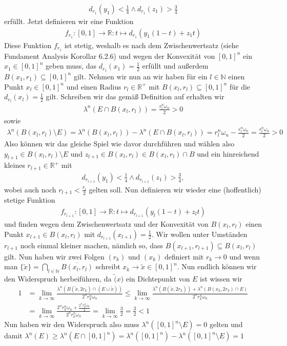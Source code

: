 \begin{solution}
\begin{align*}
    d_{r_1}(y_1)<\frac{1}{4}\land d_{r_1}(z_1)>\frac{3}{4}
\end{align*}
erfüllt.
Jetzt definieren wir eine Funktion
\begin{align*}
    f_{r_1}:[0,1]\to\mathbb{R}:t\mapsto d_{r_1}(y_1(1-t)+z_1t)
\end{align*}
Diese Funktion $f_{r_1}$ ist stetig, weshalb es nach dem Zwischenwertsatz (siehe Fundament Analysis Korollar 6.2.6) und wegen der Konvexität von $[0,1]^n$ ein $x_1\in[0,1]^n$ geben muss, das $d_{r_1}(x_1)=\frac{1}{2}$ erfüllt und außerdem $B(x_1,r_1)\subseteq[0,1]^n$ gilt. Nehmen wir nun an wir haben für ein $l\in\mathbb{N}$ einen Punkt $x_l\in[0,1]^n$ und einen Radius $r_l\in\mathbb{R}^+$ mit $B(x_l,r_l)\subseteq[0,1]^n$ für die $d_{r_l}(x_l)=\frac{1}{2}$ gilt. Schreiben wir das gemäß Definition auf erhalten wir
\begin{align*}
    \lambda^n(E\cap B(x_l,r_l))=\frac{r_l^n\omega_n}{2}>0
\end{align*}
sowie
\begin{align*}
    \lambda^n(B(x_l,r_l)\setminus E)=\lambda^n(B(x_l,r_l))-\lambda^n(E\cap B(x_l,r_l))=r_l^n\omega_n-\frac{r_l^n\omega_n}{2}=\frac{r_l^n\omega_n}{2}>0
\end{align*}
Also können wir das gleiche Spiel wie davor durchführen und wählen also $y_{l+1}\in B(x_l,r_l)\setminus E$ und $z_{l+1}\in B(x_l,r_l)\in B(x_l,r_l)\cap B$ und ein hinreichend kleines $r_{l+1}\in\mathbb{R}^+$ mit
\begin{align*}
    d_{r_{l+1}}(y_1)<\frac{1}{4}\land d_{r_{l+1}}(z_1)>\frac{3}{4},
\end{align*}
wobei auch noch $r_{l+1}<\frac{r_l}{2}$ gelten soll. Nun definieren wir wieder eine (hoffentlich) stetige Funktion
\begin{align*}
    f_{r_{l+1}}:[0,1]\to\mathbb{R}:t\mapsto d_{r_{l+1}}(y_l(1-t)+z_lt)
\end{align*}
und finden wegen dem Zwischenwertsatz und der Konvexität von $B(x_l,r_l)$ einen Punkt $x_{l+1}\in B(x_l,r_l)$ mit $d_{r_{l+1}}(x_{l+1})=\frac{1}{2}$. Wir wollen unter Umständen $r_{l+1}$ noch einmal kleiner machen, nämlich so, dass $B(x_{l+1},r_{l+1})\subseteq B(x_l,r_l)$ gilt. Nun haben wir zwei Folgen $(r_k)$ und $(x_k)$ definiert mit $r_k\to 0$ und wenn man $\{\tilde{x}\}=\bigcap_{l\in\mathbb{N}}\overline{B(x_l,r_l)}$ schreibt $x_k\to\tilde{x}\in[0,1]^n$. Nun endlich können wir den Widerspruch herbeiführen, da $\tilde(x)$ ein Dichtepunkt von $E$ ist wissen wir 
\begin{align*}
    1&=\lim_{k\to\infty}\frac{\lambda^n(B(\tilde{x},2r_k)\cap(E\cup{\tilde{x}}))}{2^nr_k^n\omega_n}\leq\lim_{k\to\infty}\frac{\lambda^n(B(\tilde{x},2r_k))+\lambda^n(B(x_k,2r_k)\cap E)}{2^nr_k^n\omega_n}\\
    &=\lim_{k\to\infty}\frac{2^nr_k^n\omega_n+\frac{2^nr_k^n\omega_n}{2}}{2^nr_k^n\omega_n}=\lim_{k\to\infty}\frac{3}{2}=\frac{3}{2}<1
\end{align*}
Nun haben wir den Widerspruch also muss $\lambda^n([0,1]^n\setminus E)=0$ gelten und damit $\lambda^n(E)\geq\lambda^n(E\cap[0,1]^n)=\lambda^n([0,1]^n)-\lambda^n([0,1]^n\setminus E)=1$
\end{solution}
